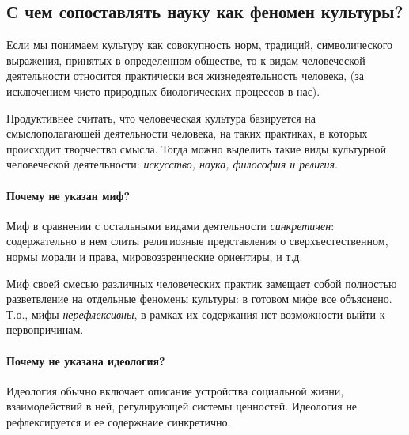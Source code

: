 \subsection{С чем сопоставлять науку как феномен культуры?}

Если мы понимаем культуру как совокупность норм,
традиций, символического выражения, принятых в определенном обществе, то к видам человеческой деятельности относится практически вся жизнедеятельность человека,
(за исключением чисто природных биологических процессов в нас). 

Продуктивнее считать, что человеческая культура базируется
на смыслополагающей деятельности человека, на таких практиках, в которых
происходит творчество смысла. Тогда можно выделить такие виды культурной человеческой деятельности: \textit{искусство, наука, философия и религия}.


\paragraph{Почему не указан миф?} 

Миф в сравнении с остальными видами деятельности \textit{синкретичен}: содержательно в нем
слиты религиозные представления о сверхъестественном, нормы морали и права,
мировоззренческие ориентиры, и т.д. 

Миф своей смесью различных человеческих практик замещает собой полностью разветвление на
отдельные феномены культуры: в готовом мифе все объяснено. Т.о., мифы \textit{нерефлексивны}, в рамках их содержания нет возможности выйти к первопричинам.

\paragraph{Почему не указана идеология?} 

Идеология обычно включает описание устройства социальной жизни, взаимодействий в ней, регулирующей системы ценностей. Идеология не рефлексируется и ее содержнаие синкретично. 

